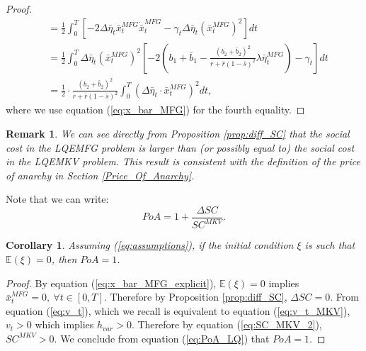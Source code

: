 \documentclass[11pt]{article}
\newtheorem{remark}{Remark}
\newtheorem{corollary}{Corollary}
\begin{document}
\begin{proof}
\begin{equation*}
\begin{split}
			&= \frac{1}{2}\int_0^T \left[- 2\Delta{\bar{\eta}}_t \bar{x}_t^{MFG} \dot{\bar{x}}_t^{MFG} - \gamma_t \Delta{\bar{\eta}}_t (\bar{x}_t^{MFG})^2 \right]dt \\
			&= \frac{1}{2} \int_0^T \Delta{\bar{\eta}}_t (\bar{x}_t^{MFG})^2 \left[-2\left(b_1 + \bar{b}_1 - \frac{(b_2+\bar{b}_2)^2}{r + \bar{r}(1-\bar{s})^2} \lambda \bar{\eta}_t^{MFG}\right) - \gamma_t\right] dt\\
			&= \frac{1}{2}\cdot \frac{(b_2 + \bar{b}_2)^2}{r + \bar{r}(1-\bar{s})^2} \int_0^T (\Delta \bar{\eta}_t \cdot \bar{x}_t^{MFG})^2 dt,
		\end{split}
	\end{equation*}
	where we use equation (\ref{eq:x_bar_MFG}) for the fourth equality.	
	
\end{proof}

\begin{remark}
	We can see directly from Proposition \ref{prop:diff_SC} that the social cost in the LQEMFG problem is larger than (or possibly equal to) the social cost in the LQEMKV problem. This result is consistent with the definition of the price of anarchy in Section \ref{Price_Of_Anarchy}.
\end{remark}

Note that we can write:
\begin{equation}
PoA =1+ \frac{\Delta SC}{SC^{MKV}}.
\label{eq:PoA_LQ}
\end{equation}

\begin{corollary}
    Assuming (\ref{eq:assumptions}), if the initial condition $\xi$ is such that $\mathbb{E}(\xi)=0$, then $PoA=1$.
\end{corollary}
\begin{proof}
    By equation (\ref{eq:x_bar_MFG_explicit}), $\mathbb{E}(\xi)=0$ implies $\bar{x}^{MFG}_t=0,\ \forall t \in [0,T]$. Therefore by Proposition \ref{prop:diff_SC}, $\Delta SC=0$. From equation (\ref{eq:v_t}), which we recall is equivalent to equation (\ref{eq:v_t_MKV}), $v_t>0$ which implies $h_{var}>0$. Therefore by equation (\ref{eq:SC_MKV_2}), $SC^{MKV}>0$. We conclude from equation (\ref{eq:PoA_LQ}) that $PoA=1$.
\end{proof}
\end{document}
